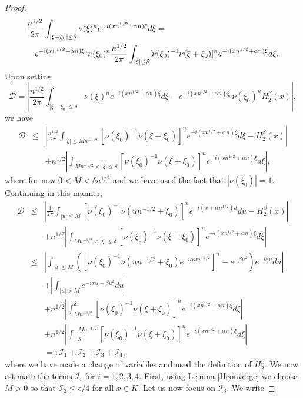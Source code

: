 \documentclass{article}
\theoremstyle{theorem}
\theoremstyle{remark}
\begin{document}
\begin{proof}
\begin{eqnarray*}
 \lefteqn{\frac{n^{1/2}}{2\pi}\int_{|\xi-\xi_0|\leq \delta}\nu(\xi)^ne^{-i(xn^{1/2}+\alpha n)\xi}d\xi=}\\ 
&&e^{-i(xn^{1/2}+\alpha n)\xi_0}\nu(\xi_0)^n \frac{n^{1/2}}{2\pi}\int_{|\xi|\leq\delta}[\nu(\xi_0)^{-1}\nu(\xi+\xi_0)]^ne^{-i(xn^{1/2}+\alpha n)\xi}d\xi.
\end{eqnarray*}
Upon setting 
\begin{equation*}
  \mathcal{D}=\left|\frac{n^{1/2}}{2\pi}\int_{|\xi-\xi_0|\leq \delta}\nu(\xi)^ne^{-i(xn^{1/2}+\alpha n)\xi}d\xi-e^{-i(xn^{1/2}+\alpha n)\xi_0}\nu(\xi_0)^n H_2^{\beta}(x)\right|,
\end{equation*}
we have
\begin{eqnarray*}
\mathcal{D}&\leq&\left|\frac{n^{1/2}}{2\pi}\int_{|\xi|\leq Mn^{-1/2}}[\nu(\xi_0)^{-1}\nu(\xi+\xi_0)]^ne^{-i(xn^{1/2}+\alpha n)\xi}d\xi-H_2^{\beta}(x)\right|\\
&&+n^{1/2}\left|\int_{Mn^{-1/2}<|\xi|\leq \delta}[\nu(\xi_0)^{-1}\nu(\xi+\xi_0)]^ne^{-i(xn^{1/2}+\alpha n)\xi}d\xi\right|,
\end{eqnarray*}
where for now $0<M<\delta n^{1/2}$ and we have used the fact that $|\nu(\xi_0)|=1$. Continuing in this manner,
\begin{eqnarray*}
 \mathcal{D}&\leq& \left|\frac{1}{2\pi}\int_{|u|\leq M}[\nu(\xi_0)^{-1}\nu(un^{-1/2}+\xi_0)]^ne^{-i(x+\alpha n^{1/2})u}du-H_2^{\beta}(x)\right|\\
&&+n^{1/2}\left|\int_{Mn^{-1/2}<|\xi|\leq \delta}[\nu(\xi_0)^{-1}\nu(\xi+\xi_0)]^ne^{-i(xn^{1/2}+\alpha n)\xi}d\xi\right|\\
&\leq& \left|\int_{|u|\leq M}\left([\nu(\xi_0)^{-1}\nu(un^{-1/2}+\xi_0)e^{-i\alpha un^{-1/2}}]^n-e^{-\beta u^2}\right)e^{-ixu}du\right|\\
&&+\left|\int_{|u|>M}e^{-ixu-\beta u^2}du\right|\\
&&+n^{1/2}\left|\int_{Mn^{-1/2}}^{\delta}[\nu(\xi_0)^{-1}\nu(\xi+\xi_0)]^ne^{-i(xn^{1/2}+\alpha n)\xi}d\xi\right|\\
&&+n^{1/2}\left|\int_{-\delta}^{-Mn^{-1/2}}[\nu(\xi_0)^{-1}\nu(\xi+\xi_0)]^ne^{-i(xn^{1/2}+\alpha n)\xi}d\xi\right|\\
&&=:\mathcal{I}_1+\mathcal{I}_2+\mathcal{I}_3+\mathcal{I}_4,
\end{eqnarray*}
where we have made a change of variables and used the definition of $H_2^{\beta}$. We now estimate the terms $\mathcal{I}_i$ for $i=1,2,3,4$. First, using Lemma \ref{Hconverge} we choose $M>0$ so that $\mathcal{I}_2\leq \epsilon/4$ for all $x\in K$. Let us now focus on $\mathcal{I}_3$. We write

\end{proof}
\end{document}
